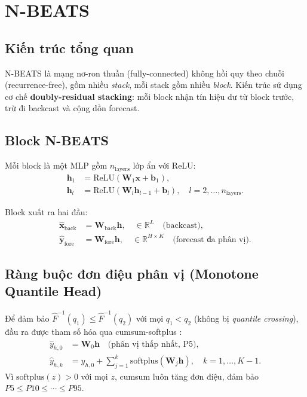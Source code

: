 \documentclass[12pt, a4paper]{report}
\begin{document}
\section{N-BEATS}

\subsection{Kiến trúc tổng quan}

N-BEATS \cite{oreshkin2019n} là mạng nơ-ron thuần (fully-connected) không hồi quy theo chuỗi (recurrence-free), gồm nhiều \textit{stack}, mỗi stack gồm nhiều \textit{block}. Kiến trúc sử dụng cơ chế \textbf{doubly-residual stacking}: mỗi block nhận tín hiệu dư từ block trước, trừ đi backcast và cộng dồn forecast.

\subsection{Block N-BEATS}

Mỗi block là một MLP gồm $n_{\text{layers}}$ lớp ẩn với ReLU:
\begin{align}
  \mathbf{h}_1 &= \text{ReLU}(\mathbf{W}_1 \mathbf{x} + \mathbf{b}_1), \\
  \mathbf{h}_l &= \text{ReLU}(\mathbf{W}_l \mathbf{h}_{l-1} + \mathbf{b}_l), \quad l=2,\ldots,n_{\text{layers}}.
\end{align}

Block xuất ra hai đầu:
\begin{align}
  \hat{\mathbf{x}}_{\text{back}} &= \mathbf{W}_{\text{back}} \mathbf{h}, \quad \in \mathbb{R}^L \quad \text{(backcast)}, \\
  \hat{\mathbf{y}}_{\text{fore}} &= \mathbf{W}_{\text{fore}} \mathbf{h}, \quad \in \mathbb{R}^{H \times K} \quad \text{(forecast đa phân vị)}.
\end{align}

\subsection{Ràng buộc đơn điệu phân vị (Monotone Quantile Head)}

Để đảm bảo $\hat{F}^{-1}(q_1) \leq \hat{F}^{-1}(q_2)$ với mọi $q_1 < q_2$ (không bị \textit{quantile crossing}), đầu ra được tham số hóa qua cumsum-softplus \cite{chung2021beyond}:
\begin{align}
  \hat{y}_{h,0} &= \mathbf{W}_0 \mathbf{h} \quad \text{(phân vị thấp nhất, P5)}, \\
  \hat{y}_{h,k} &= \hat{y}_{h,0} + \sum_{j=1}^{k} \text{softplus}(\mathbf{W}_j \mathbf{h}), \quad k=1,\ldots,K-1.
\end{align}
Vì $\text{softplus}(z) > 0$ với mọi $z$, cumsum luôn tăng đơn điệu, đảm bảo $P5 \leq P10 \leq \cdots \leq P95$.
\end{document}
